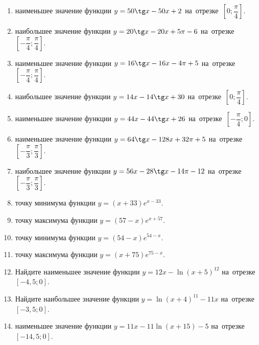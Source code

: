 \documentclass[a4paper,10pt]{article}
\begin{document}
\begin{enumerate}
\item {} наименьшее значение функции $y = 50\tg x-50x+2$ на~отрезке~$\left[0;\dfrac{\pi }{4}\right]$.

\item {} наибольшее значение функции $y=20\tg x-20x+5\pi -6$ на~отрезке~$\left[-\dfrac{\pi }{4};\dfrac{\pi }{4}\right]$.

\item {} наименьшее значение функции $y=16\tg x-16x-4\pi +5$ на~отрезке~$\left[-\dfrac{\pi }{4};\dfrac{\pi }{4}\right]$.

\item {} наибольшее значение функции $y = 14x-14\tg x +30$ на~отрезке~$\left[0;\dfrac{\pi }{4}\right]$.

\item {} наименьшее значение функции $y = 44x-44\tg x +26$ на~отрезке~$\left[-\dfrac{\pi }{4};0\right]$.

\item {} наименьшее значение функции $y = 64\tg x-128x+32 \pi +5$ на~отрезке~$\left[-\dfrac{\pi }{3};\dfrac{\pi }{3}\right]$.

\item {} наибольшее значение функции $y = 56x-28\tg x-14\pi -12$ на~отрезке~$\left[-\dfrac{\pi }{3};\dfrac{\pi }{3}\right]$.

\item {} точку минимума функции $y = \left(x+33\right)e^{x-33}$.

\item {} точку максимума функции $y = \left(57-x\right)e^{x+57}$.

\item {} точку минимума функции $y = \left(54-x\right)e^{54-x}$.

\item {} точку максимума функции $y = \left(x+75\right)e^{75-x}$.

\item Найдите наименьшее значение функции $y = 12x-\ln \left(x+5\right)^{12}$ на~отрезке~$\left[-4,5;0\right]$.

\item Найдите наибольшее значение функции $y = \ln \left(x+4\right)^{11}-11x$ на~отрезке~$\left[-3,5;0\right]$.

\item {} наименьшее значение функции $y = 11x-11\ln \left(x+15\right) -5$ на~отрезке~$\left[-14,5;0\right]$.


\end{enumerate}
\end{document}
